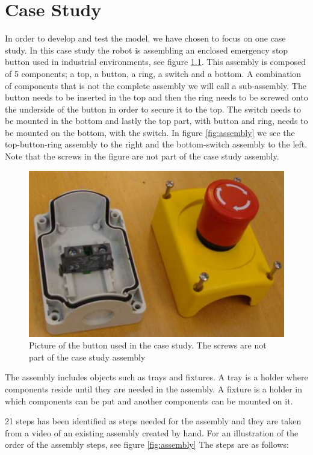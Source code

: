 \chapter{Case Study}\label{cha:assembly}
In order to develop and test the model, we have chosen to focus on one case study. In this case study the robot is assembling an enclosed emergency stop button used in industrial environments, see figure \ref{fig:button}. This assembly is composed of 5 components; a top, a button, a ring, a switch and a bottom. A combination of components that is not the complete assembly we will call a sub-assembly. The button needs to be inserted in the top and then the ring needs to be screwed onto the underside of the button in order to secure it to the top. The switch needs to be mounted in the bottom and lastly the top part, with button and ring, needs to be mounted on the bottom, with the switch. In figure \ref{fig:assembly} we see the top-button-ring assembly to the right and the bottom-switch assembly to the left. Note that the screws in the figure are not part of the case study assembly.

\begin{figure}
\centering
\includegraphics[width=\textwidth/3*2]{Figures/buttonbox.png}
\caption{Picture of the button used in the case study. The screws are not part of the case study assembly}
\label{fig:button}
\end{figure}

The assembly includes objects such as trays and fixtures. A tray is a holder where components reside until they are needed in the assembly. A fixture is a holder in which components can be put and another components can be mounted on it.

21 steps has been identified as steps needed for the assembly and they are taken from a video of an existing assembly created by hand. For an illustration of the order of the assembly steps, see figure \ref{fig:assembly} The steps are as follows:

